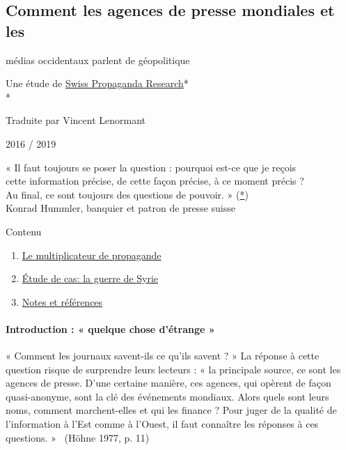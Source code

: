 \hypertarget{comment-les-agences-de-presse-mondiales-et-les}{%
\subsection{Comment les agences de presse mondiales et
les}\label{comment-les-agences-de-presse-mondiales-et-les}}

médias occidentaux parlent de géopolitique

Une étude de \href{https://swprs.org/contact/}{Swiss Propaganda
Research}*\\
*

Traduite par Vincent Lenormant

2016 / 2019

« Il faut toujours se poser la question : pourquoi est-ce que je
reçois\\
cette information précise, de cette façon précise, à ce moment précis
?\\
Au final, ce sont toujours des questions de pouvoir. »
(\href{http://www.nzz.ch/wer-lustvoll-schreibt-der-schreibt-auch-gut-1.11329756}{*})\\
Konrad Hummler, banquier et patron de presse suisse

Contenu

\begin{enumerate}
\def\labelenumi{\arabic{enumi}.}
\tightlist
\item
  \protect\hyperlink{k1}{Le multiplicateur de propagande}
\item
  \protect\hyperlink{k2}{Étude de cas: la guerre de Syrie}
\item
  \protect\hyperlink{k3}{Notes et références}
\end{enumerate}

\hypertarget{introduction---quelque-chose-duxe9trange-}{%
\paragraph{Introduction : « quelque chose d'étrange
»}\label{introduction---quelque-chose-duxe9trange-}}

« Comment les journaux savent-ils ce qu'ils savent ? » La réponse à
cette question risque de surprendre leurs lecteurs : « la principale
source, ce sont les agences de presse. D'une certaine manière, ces
agences, qui opèrent de façon quasi-anonyme, sont la clé des événements
mondiaux. Alors quels sont leurs noms, comment marchent-elles et qui les
finance ? Pour juger de la qualité de l'information à l'Est comme à
l'Ouest, il faut connaître les réponses à ces questions. »~ (Höhne 1977,
p. 11)

